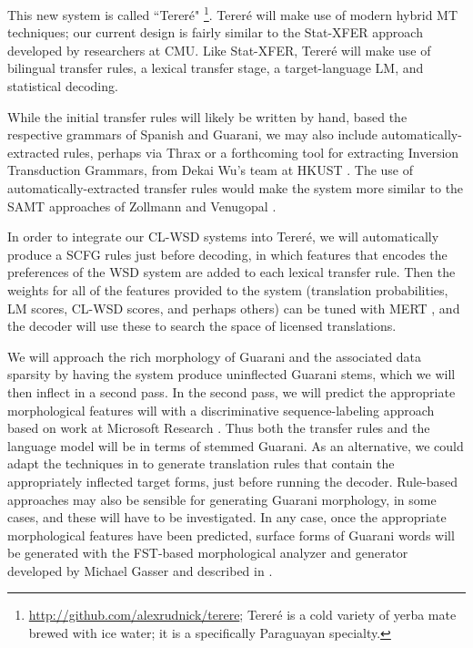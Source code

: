 This new system is called ``Tereré"
\footnote{\url{http://github.com/alexrudnick/terere}; 
Tereré is a cold variety of yerba mate brewed with ice water; it is a
specifically Paraguayan specialty.}.
Tereré will make use of modern hybrid MT techniques; our current design is
fairly similar to the Stat-XFER approach \cite{DBLP:conf/cicling/Lavie08}
developed by researchers at CMU.
Like Stat-XFER, Tereré will make use of bilingual transfer rules, a lexical
transfer stage, a target-language LM, and statistical decoding.

While the initial transfer rules will likely be written by hand, based the
respective grammars of Spanish and Guarani, we may also include
automatically-extracted rules, perhaps via Thrax \cite{weese-EtAl:2011:WMT} or
a forthcoming tool for extracting Inversion Transduction Grammars, from Dekai
Wu's team at HKUST \cite{saers-addanki-wu:2013:HyTra}.
The use of automatically-extracted transfer rules would make the system more
similar to the SAMT approaches of Zollmann and Venugopal
.

In order to integrate our CL-WSD systems into Tereré, we will automatically
produce a SCFG rules just before decoding, in which features that encodes the
preferences of the WSD system are added to each lexical transfer rule. Then
the weights for all of the features provided to the system (translation
probabilities, LM scores, CL-WSD scores, and perhaps others) can be tuned with
MERT \cite{och:2003:ACL}, and the decoder will use these to search the space of
licensed translations.

We will approach the rich morphology of Guarani and the associated data
sparsity by having the system produce uninflected Guarani stems, which we will
then inflect in a second pass.
In the second pass, we will predict the appropriate morphological features will
with a discriminative sequence-labeling approach based on work at Microsoft
Research \cite{toutanova-suzuki-ruopp:2008:ACLMain}.
Thus both the transfer rules and the language model will be in terms of stemmed
Guarani.
As an alternative, we could adapt the techniques in
\cite{chahuneau:2013:emnlp} to generate translation rules that contain the
appropriately inflected target forms, just before running the decoder.
Rule-based approaches may also be sensible for generating Guarani morphology,
in some cases, and these will have to be investigated. In any case, once the
appropriate morphological features have been predicted, surface forms of
Guarani words will be generated with the FST-based morphological analyzer and
generator developed by Michael Gasser and described in
\cite{rudnick-gasser:2013:HyTra-2013}.

